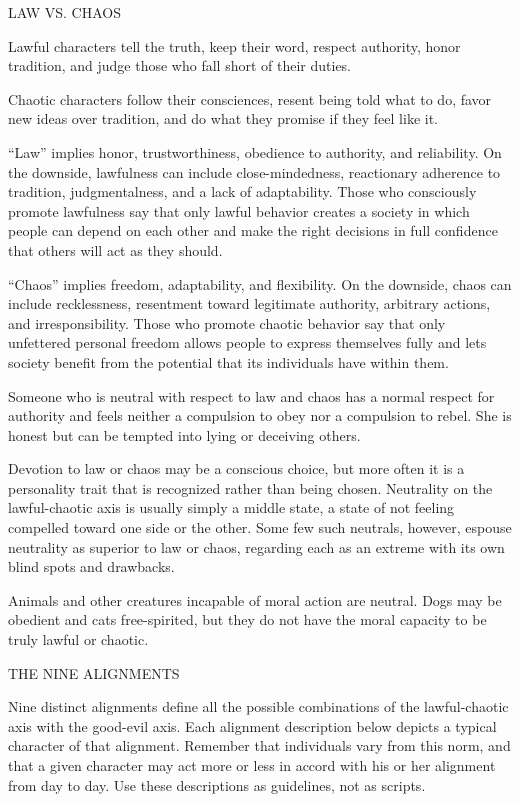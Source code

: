 \documentclass{article}
\begin{document}
\vspace{12pt}
LAW VS. CHAOS

Lawful characters tell the truth, keep their word, respect authority, honor tradition, 
and judge those who fall short of their duties. 

Chaotic characters follow their consciences, resent being told what to do, favor 
new ideas over tradition, and do what they promise if they feel like it.

``Law'' implies honor, trustworthiness, obedience to authority, and reliability. 
On the downside, lawfulness can include close-mindedness, reactionary adherence 
to tradition, judgmentalness, and a lack of adaptability. Those who consciously 
promote lawfulness say that only lawful behavior creates a society in which people 
can depend on each other and make the right decisions in full confidence that others 
will act as they should.

``Chaos'' implies freedom, adaptability, and flexibility. On the downside, chaos 
can include recklessness, resentment toward legitimate authority, arbitrary actions, 
and irresponsibility. Those who promote chaotic behavior say that only unfettered 
personal freedom allows people to express themselves fully and lets society benefit 
from the potential that its individuals have within them.

Someone who is neutral with respect to law and chaos has a normal respect for authority 
and feels neither a compulsion to obey nor a compulsion to rebel. She is honest 
but can be tempted into lying or deceiving others.

Devotion to law or chaos may be a conscious choice, but more often it is a personality 
trait that is recognized rather than being chosen. Neutrality on the lawful-chaotic 
axis is usually simply a middle state, a state of not feeling compelled toward 
one side or the other. Some few such neutrals, however, espouse neutrality as superior 
to law or chaos, regarding each as an extreme with its own blind spots and drawbacks.

Animals and other creatures incapable of moral action are neutral. Dogs may be 
obedient and cats free-spirited, but they do not have the moral capacity to be 
truly lawful or chaotic.

\vspace{12pt}
THE NINE ALIGNMENTS

Nine distinct alignments define all the possible combinations of the lawful-chaotic 
axis with the good-evil axis. Each alignment description below depicts a typical 
character of that alignment. Remember that individuals vary from this norm, and 
that a given character may act more or less in accord with his or her alignment 
from day to day. Use these descriptions as guidelines, not as scripts.
\end{document}
